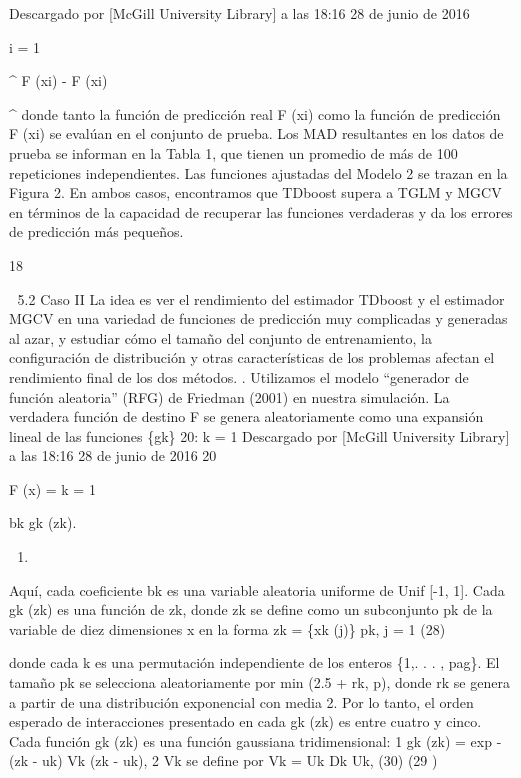 \documentclass[]{article}
\begin{document}
Descargado por {[}McGill University Library{]} a las 18:16 28 de junio
de 2016

i = 1

\^{} \textbar{} F (xi) - F (xi) \textbar{}

\^{} donde tanto la función de predicción real F (xi) como la función de
predicción F (xi) se evalúan en el conjunto de prueba. Los MAD
resultantes en los datos de prueba se informan en la Tabla 1, que tienen
un promedio de más de 100 repeticiones independientes. Las funciones
ajustadas del Modelo 2 se trazan en la Figura 2. En ambos casos,
encontramos que TDboost supera a TGLM y MGCV en términos de la capacidad
de recuperar las funciones verdaderas y da los errores de predicción más
pequeños.

18

 5.2 Caso II La idea es ver el rendimiento del estimador TDboost y el
estimador MGCV en una variedad de funciones de predicción muy
complicadas y generadas al azar, y estudiar cómo el tamaño del conjunto
de entrenamiento, la configuración de distribución y otras
características de los problemas afectan el rendimiento final de los dos
métodos. . Utilizamos el modelo ``generador de función aleatoria'' (RFG)
de Friedman (2001) en nuestra simulación. La verdadera función de
destino F se genera aleatoriamente como una expansión lineal de las
funciones \{gk\} 20: k = 1 Descargado por {[}McGill University
Library{]} a las 18:16 28 de junio de 2016 20

F (x) = k = 1

bk gk (zk).

\begin{enumerate}
\def\labelenumi{(\arabic{enumi})}
\setcounter{enumi}{26}
\item
\end{enumerate}

Aquí, cada coeficiente bk es una variable aleatoria uniforme de Unif
{[}-1, 1{]}. Cada gk (zk) es una función de zk, donde zk se define como
un subconjunto pk de la variable de diez dimensiones x en la forma zk =
\{xk (j)\} pk, j = 1 (28)

donde cada k es una permutación independiente de los enteros \{1,. . . ,
pag\}. El tamaño pk se selecciona aleatoriamente por min (2.5 + rk, p),
donde rk se genera a partir de una distribución exponencial con media 2.
Por lo tanto, el orden esperado de interacciones presentado en cada gk
(zk) es entre cuatro y cinco. Cada función gk (zk) es una función
gaussiana tridimensional: 1 gk (zk) = exp - (zk - uk) Vk (zk - uk), 2 Vk
se define por Vk = Uk Dk Uk, (30) (29 )
\end{document}
